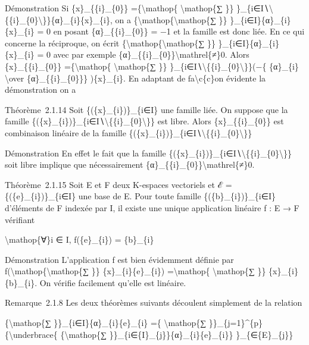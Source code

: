 \documentclass[]{article}
\begin{document}
Démonstration Si \{x\}\_\{\{i\}\_\{0\}\} =\{\textbackslash{}mathop\{
\textbackslash{}mathop\{∑ \}\}
\}\_\{i∈I∖\textbackslash{}\{\{i\}\_\{0\}\textbackslash{}\}\}\{α\}\_\{i\}\{x\}\_\{i\},
on a \{\textbackslash{}mathop\{\textbackslash{}mathop\{∑ \}\}
\}\_\{i∈I\}\{α\}\_\{i\}\{x\}\_\{i\} = 0 en posant
\{α\}\_\{\{i\}\_\{0\}\} = −1 et la famille est donc liée. En ce qui
concerne la réciproque, on écrit
\{\textbackslash{}mathop\{\textbackslash{}mathop\{∑ \}\}
\}\_\{i∈I\}\{α\}\_\{i\}\{x\}\_\{i\} = 0 avec par exemple
\{α\}\_\{\{i\}\_\{0\}\}\textbackslash{}mathrel\{≠\}0. Alors
\{x\}\_\{\{i\}\_\{0\}\} =\{\textbackslash{}mathop\{
\textbackslash{}mathop\{∑ \}\}
\}\_\{i∈I∖\textbackslash{}\{\{i\}\_\{0\}\textbackslash{}\}\}(−\{
\{α\}\_\{i\} \textbackslash{}over \{α\}\_\{\{i\}\_\{0\}\}\}
)\{x\}\_\{i\}. En adaptant de fa\textbackslash{}c\{c\}on évidente la
démonstration on a

Théorème~2.1.14 Soit \{(\{x\}\_\{i\})\}\_\{i∈I\} une famille liée. On
suppose que la famille
\{(\{x\}\_\{i\})\}\_\{i∈I∖\textbackslash{}\{\{i\}\_\{0\}\textbackslash{}\}\}
est libre. Alors \{x\}\_\{\{i\}\_\{0\}\} est combinaison linéaire de la
famille
\{(\{x\}\_\{i\})\}\_\{i∈I∖\textbackslash{}\{\{i\}\_\{0\}\textbackslash{}\}\}

Démonstration En effet le fait que la famille
\{(\{x\}\_\{i\})\}\_\{i∈I∖\textbackslash{}\{\{i\}\_\{0\}\textbackslash{}\}\}
soit libre implique que nécessairement
\{α\}\_\{\{i\}\_\{0\}\}\textbackslash{}mathrel\{≠\}0.

Théorème~2.1.15 Soit E et F deux K-espaces vectoriels et ℰ =
\{(\{e\}\_\{i\})\}\_\{i∈I\} une base de E. Pour toute famille
\{(\{b\}\_\{i\})\}\_\{i∈I\} d'éléments de F indexée par I, il existe une
unique application linéaire f : E → F vérifiant

\textbackslash{}mathop\{∀\}i ∈ I, f(\{e\}\_\{i\}) = \{b\}\_\{i\}

Démonstration L'application f est bien évidemment définie par
f(\textbackslash{}mathop\{\textbackslash{}mathop\{∑ \}\}
\{x\}\_\{i\}\{e\}\_\{i\}) =\textbackslash{}mathop\{
\textbackslash{}mathop\{∑ \}\} \{x\}\_\{i\}\{b\}\_\{i\}. On vérifie
facilement qu'elle est linéaire.

Remarque~2.1.8 Les deux théorèmes suivants découlent simplement de la
relation

\{\textbackslash{}mathop\{∑ \}\}\_\{i∈I\}\{α\}\_\{i\}\{e\}\_\{i\} =\{
\textbackslash{}mathop\{∑
\}\}\_\{j=1\}\^{}\{p\}\{\textbackslash{}underbrace\{
\{\textbackslash{}mathop\{∑
\}\}\_\{i∈\{I\}\_\{j\}\}\{α\}\_\{i\}\{e\}\_\{i\}\} \}\_\{∈\{E\}\_\{j\}\}
\end{document}

